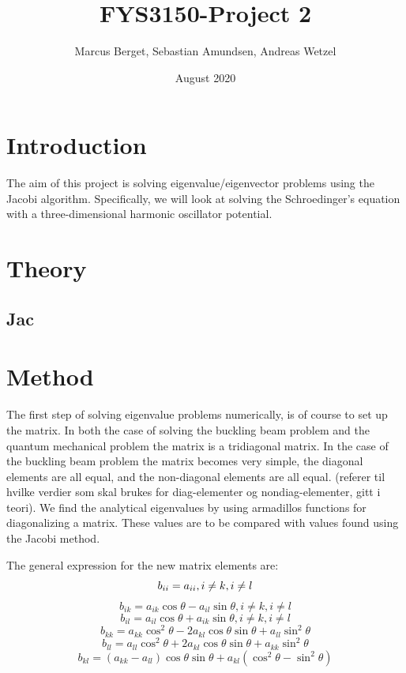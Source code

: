 \documentclass[norsk,a4paper,12pt]{article}
\begin{document}
\title{FYS3150-Project 2}
\author{Marcus Berget, Sebastian Amundsen, Andreas Wetzel}
\date{August 2020}
\maketitle

\begin{abstract}

\end{abstract}

\section{Introduction}

The aim of this project is solving eigenvalue/eigenvector problems using the Jacobi algorithm. Specifically, we will look at solving the Schroedinger's equation with a three-dimensional harmonic oscillator potential. 

\section{Theory}
\subsection{Jac}

\section{Method}

The first step of solving eigenvalue problems numerically, is of course to set up the matrix. In both the case of solving the buckling beam problem and the quantum mechanical problem the matrix is a tridiagonal matrix. In the case of the buckling beam problem the matrix becomes very simple, the diagonal elements are all equal, and the non-diagonal elements are all equal. (referer til hvilke verdier som skal brukes for diag-elementer og nondiag-elementer, gitt i teori). 
We find the analytical eigenvalues by using armadillos functions for diagonalizing a matrix. These values are to be compared with values found using the Jacobi method. 


The general expression for the new matrix elements are:
$$
b_{ii}=a_{ii}, i\neq k, i\neq l \\
$$
$$
b_{ik}=a_{ik}\cos \theta - a_{il}\sin \theta, i\neq k, i\neq l
$$
$$
b_{il}=a_{il}\cos\theta+a_{ik}\sin\theta, i\neq k, i\neq l
$$
$$
b_{kk}=a_{kk} \cos^2\theta - 2a_{kl}\cos\theta \sin\theta + a_{ll}\sin^2\theta
$$
$$
b_{ll}=a_{ll}\cos^2\theta+2a_{kl}\cos\theta \sin\theta + a_{kk}\sin^2\theta
$$
\begin{equation}
b_{kl} = (a_{kk}-a_{ll})\cos\theta\sin\theta+a_{kl}(\cos^2\theta-\sin^2\theta)
 \label{eq:Jacob}
 \end{equation}
\end{document}
